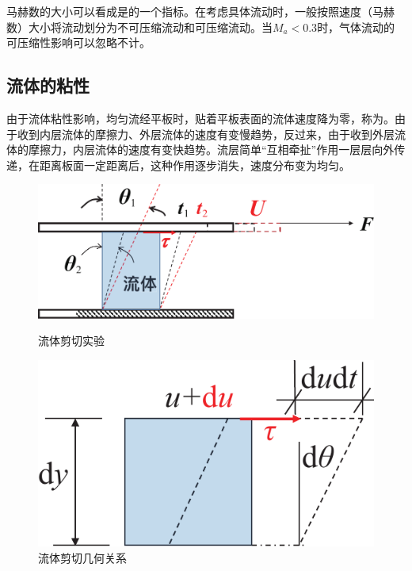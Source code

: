 马赫数的大小可以看成是\blue[气体相对压缩性]的一个指标。在考虑具体流动时，一般按照速度（马赫数）大小将流动划分为不可压缩流动和可压缩流动。当$M_a < 0.3$时，气体流动的可压缩性影响可以忽略不计。
\vspace*{0.5em}

\subsection{流体的粘性}
由于流体粘性影响，均匀流经平板时，贴着平板表面的流体速度降为零，称为。由于收到内层流体的摩擦力、外层流体的速度有变慢趋势，反过来，由于收到外层流体的摩擦力，内层流体的速度有变快趋势。流层简单“互相牵扯”作用一层层向外传递，在距离板面一定距离后，这种作用逐步消失，速度分布变为均匀。


\begin{figure}[!htb]
	\centering
	\begin{minipage}{0.45 \linewidth}
		\centering
		\includegraphics[width=\linewidth]{pic/流体粘性实验.pdf}
		\caption{流体剪切实验}
		\label{流体剪切实验}
	\end{minipage}
	\begin{minipage}{0.45 \linewidth}
		\centering
		\includegraphics[width=0.7\linewidth]{pic/粘性几何关系.pdf}
		\vspace*{0.1em}
		\caption{流体剪切几何关系}
		\label{流体剪切几何关系}
	\end{minipage}
\end{figure}
\vspace*{-1em}

